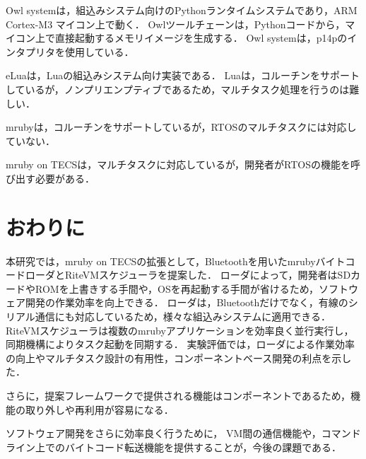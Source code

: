 \documentclass[submit,techrep]{ipsj}
\begin{document}
Owl systemは，組込みシステム向けのPythonランタイムシステムであり，ARM Cortex-M3 マイコン上で動く．
Owlツールチェーンは，Pythonコードから，マイコン上で直接起動するメモリイメージを生成する．
Owl systemは，p14pのインタプリタを使用している．

eLuaは，Luaの組込みシステム向け実装である．
Luaは，コルーチンをサポートしているが，ノンプリエンプティブであるため，マルチタスク処理を行うのは難しい．

mrubyは，コルーチンをサポートしているが，RTOSのマルチタスクには対応していない．

mruby on TECSは，マルチタスクに対応しているが，開発者がRTOSの機能を呼び出す必要がある．


\vspace{-1mm}
\section{おわりに}
\vspace{-2mm}
\label{sec:Conclusion}
本研究では，mruby on TECSの拡張として，Bluetoothを用いたmrubyバイトコードローダとRiteVMスケジューラを提案した．
ローダによって，開発者はSDカードやROMを上書きする手間や，OSを再起動する手間が省けるため，ソフトウェア開発の作業効率を向上できる．
ローダは，Bluetoothだけでなく，有線のシリアル通信にも対応しているため，様々な組込みシステムに適用できる．
RiteVMスケジューラは複数のmrubyアプリケーションを効率良く並行実行し，同期機構によりタスク起動を同期する．
実験評価では，ローダによる作業効率の向上やマルチタスク設計の有用性，コンポーネントベース開発の利点を示した．

さらに，提案フレームワークで提供される機能はコンポーネントであるため，機能の取り外しや再利用が容易になる．

ソフトウェア開発をさらに効率良く行うために，%
VM間の通信機能や，コマンドライン上でのバイトコード転送機能を提供することが，今後の課題である．
\end{document}
